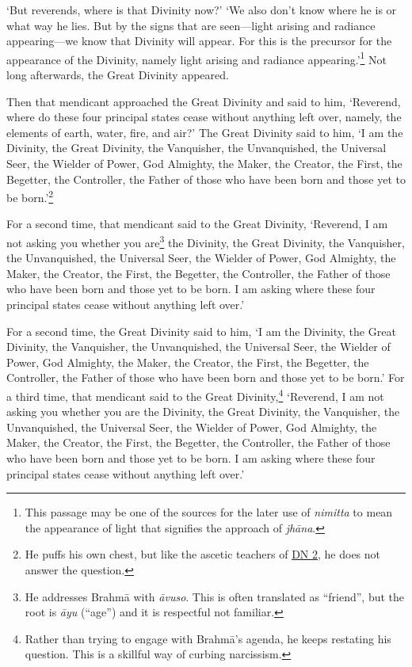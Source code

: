 \documentclass[12pt,openany]{book}%
\begin{document}
‘But reverends, where is that Divinity now?’ ‘We also don’t know where he is or what way he lies. But by the signs that are seen—light arising and radiance appearing—we know that Divinity will appear. For this is the precursor for the appearance of the Divinity, namely light arising and radiance appearing.’\footnote{This passage may be one of the sources for the later use of \textit{nimitta} to mean the appearance of light that signifies the approach of \textit{\textsanskrit{jhāna}}. } Not long afterwards, the Great Divinity appeared. 

Then that mendicant approached the Great Divinity and said to him, ‘Reverend, where do these four principal states cease without anything left over, namely, the elements of earth, water, fire, and air?’ The Great Divinity said to him, ‘I am the Divinity, the Great Divinity, the Vanquisher, the Unvanquished, the Universal Seer, the Wielder of Power, God Almighty, the Maker, the Creator, the First, the Begetter, the Controller, the Father of those who have been born and those yet to be born.’\footnote{He puffs his own chest, but like the ascetic teachers of \href{https://suttacentral.net/dn2/en/sujato}{DN 2}, he does not answer the question. } 

For a second time, that mendicant said to the Great Divinity, ‘Reverend, I am not asking you whether you are\footnote{He addresses \textsanskrit{Brahmā} with \textit{\textsanskrit{āvuso}}. This is often translated as “friend”, but the root is \textit{\textsanskrit{āyu}} (“age”) and it is respectful not familiar. } the Divinity, the Great Divinity, the Vanquisher, the Unvanquished, the Universal Seer, the Wielder of Power, God Almighty, the Maker, the Creator, the First, the Begetter, the Controller, the Father of those who have been born and those yet to be born. I am asking where these four principal states cease without anything left over.’ 

For a second time, the Great Divinity said to him, ‘I am the Divinity, the Great Divinity, the Vanquisher, the Unvanquished, the Universal Seer, the Wielder of Power, God Almighty, the Maker, the Creator, the First, the Begetter, the Controller, the Father of those who have been born and those yet to be born.’ For a third time, that mendicant said to the Great Divinity,\footnote{Rather than trying to engage with \textsanskrit{Brahmā}’s agenda, he keeps restating his question. This is a skillful way of curbing narcissism. } ‘Reverend, I am not asking you whether you are the Divinity, the Great Divinity, the Vanquisher, the Unvanquished, the Universal Seer, the Wielder of Power, God Almighty, the Maker, the Creator, the First, the Begetter, the Controller, the Father of those who have been born and those yet to be born. I am asking where these four principal states cease without anything left over.’ 
\end{document}
